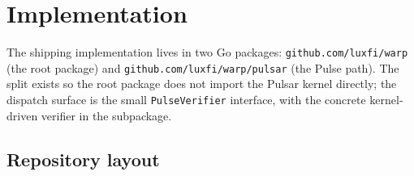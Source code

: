 \section{Implementation}
\label{sec:warp-implementation}

The shipping implementation lives in two Go packages: \texttt{github.com/luxfi/warp} (the root package) and \texttt{github.com/luxfi/warp/pulsar} (the Pulse path). The split exists so the root package does not import the Pulsar kernel directly; the dispatch surface is the small \texttt{PulseVerifier} interface, with the concrete kernel-driven verifier in the subpackage.

\subsection{Repository layout}

